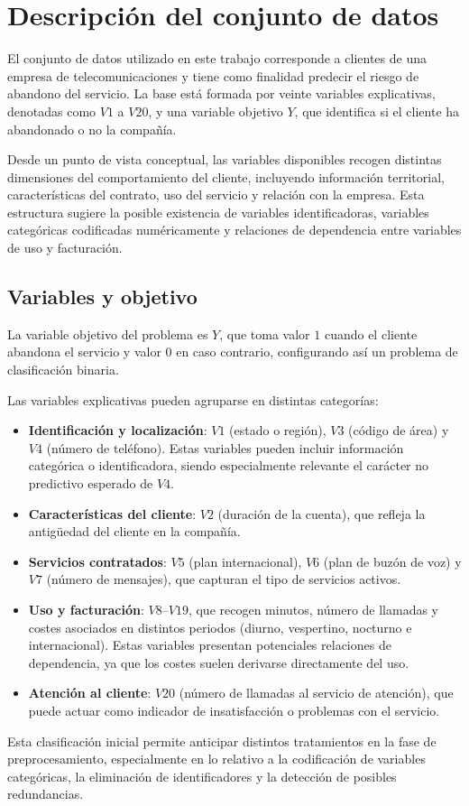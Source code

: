 \section{Descripción del conjunto de datos}

El conjunto de datos utilizado en este trabajo corresponde a clientes de una empresa de telecomunicaciones y tiene como finalidad predecir el riesgo de abandono del servicio. La base está formada por veinte variables explicativas, denotadas como \(V1\) a \(V20\), y una variable objetivo \(Y\), que identifica si el cliente ha abandonado o no la compañía.

Desde un punto de vista conceptual, las variables disponibles recogen distintas dimensiones del comportamiento del cliente, incluyendo información territorial, características del contrato, uso del servicio y relación con la empresa. Esta estructura sugiere la posible existencia de variables identificadoras, variables categóricas codificadas numéricamente y relaciones de dependencia entre variables de uso y facturación.

\subsection{Variables y objetivo}

La variable objetivo del problema es \(Y\), que toma valor \(1\) cuando el cliente abandona el servicio y valor \(0\) en caso contrario, configurando así un problema de clasificación binaria.

Las variables explicativas pueden agruparse en distintas categorías:

\begin{itemize}
    \item \textbf{Identificación y localización}: \(V1\) (estado o región), \(V3\) (código de área) y \(V4\) (número de teléfono). Estas variables pueden incluir información categórica o identificadora, siendo especialmente relevante el carácter no predictivo esperado de \(V4\).
    
    \item \textbf{Características del cliente}: \(V2\) (duración de la cuenta), que refleja la antigüedad del cliente en la compañía.
    
    \item \textbf{Servicios contratados}: \(V5\) (plan internacional), \(V6\) (plan de buzón de voz) y \(V7\) (número de mensajes), que capturan el tipo de servicios activos.
    
    \item \textbf{Uso y facturación}: \(V8\)–\(V19\), que recogen minutos, número de llamadas y costes asociados en distintos periodos (diurno, vespertino, nocturno e internacional). Estas variables presentan potenciales relaciones de dependencia, ya que los costes suelen derivarse directamente del uso.
    
    \item \textbf{Atención al cliente}: \(V20\) (número de llamadas al servicio de atención), que puede actuar como indicador de insatisfacción o problemas con el servicio.
\end{itemize}

Esta clasificación inicial permite anticipar distintos tratamientos en la fase de preprocesamiento, especialmente en lo relativo a la codificación de variables categóricas, la eliminación de identificadores y la detección de posibles redundancias.